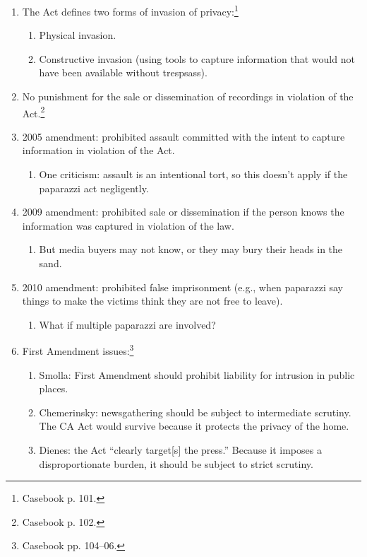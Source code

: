 \begin{enumerate}
    \item The Act defines two forms of invasion of privacy:\footnote{Casebook p. 
    101.}
    \begin{enumerate}
        \item Physical invasion.
        \item Constructive invasion (using tools to capture information that 
        would not have been available without trespsass).
    \end{enumerate}
    \item No punishment for the sale or dissemination of recordings in violation 
    of the Act.\footnote{Casebook p. 102.}
    \item 2005 amendment: prohibited assault committed with the intent to 
    capture information in violation of the Act.
    \begin{enumerate}
        \item One criticism: assault is an intentional tort, so this doesn't 
        apply if the paparazzi act negligently.
    \end{enumerate}
    \item 2009 amendment: prohibited sale or dissemination if the person knows 
    the information was captured in violation of the law.
    \begin{enumerate}
        \item But media buyers may not know, or they may bury their heads in the 
        sand.
    \end{enumerate}
    \item 2010 amendment: prohibited false imprisonment (e.g., when paparazzi 
    say things to make the victims think they are not free to leave).
    \begin{enumerate}
        \item What if multiple paparazzi are involved?
    \end{enumerate}
    \item First Amendment issues:\footnote{Casebook pp. 104--06.}
    \begin{enumerate}
        \item Smolla: First Amendment should prohibit liability for intrusion in 
        public places.
        \item Chemerinsky: newsgathering should be subject to intermediate 
        scrutiny. The CA Act would survive because it protects the privacy of 
        the home.
        \item Dienes: the Act ``clearly target[s] the press.'' Because it 
        imposes a disproportionate burden, it should be subject to strict 
        scrutiny.
    \end{enumerate}
\end{enumerate}

